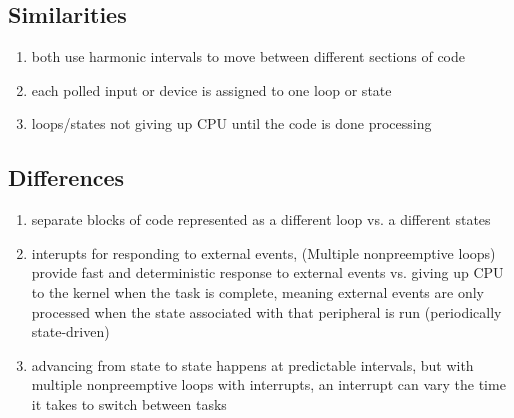 \begin{comment}
  Multiple Nonpreemptive Loops with Interrupts (cont’d)
• Advantages:
– Guaranteed minimum polling frequency for each
input or device
– Guaranteed maximum response time for polled
inputs and devices
– External events are handled promptly and
deterministically using hardware-triggered interrupts.
• Disadvantages:
– Some devices may be polled faster than necessary,
which is wasteful of the processor’s time.
– The one software thread has less cohesion because
it now handles more than one loop. A state variable
keeps track of the timer ISR calls and the active loop.

\end{comment}


\subsection*{Similarities}
\begin{enumerate}
  \item both use harmonic intervals to move between different sections of code
  \item each polled input or device is assigned to one loop or state
  \item loops/states not giving up CPU until the code is done processing
\end{enumerate}

\subsection*{Differences}
\begin{enumerate}
  \item separate blocks of code represented as a different loop vs. a different
    states
  \item interupts for responding to external events, (Multiple nonpreemptive
    loops) provide fast and deterministic response to external events vs. giving
    up CPU to the kernel when the task is complete, meaning external events are
    only processed when the state associated with that peripheral is run
    (periodically state-driven)
  \item advancing from state to state happens at predictable intervals, but with
    multiple nonpreemptive loops with interrupts, an interrupt can vary the time
    it takes to switch between tasks
\end{enumerate}
